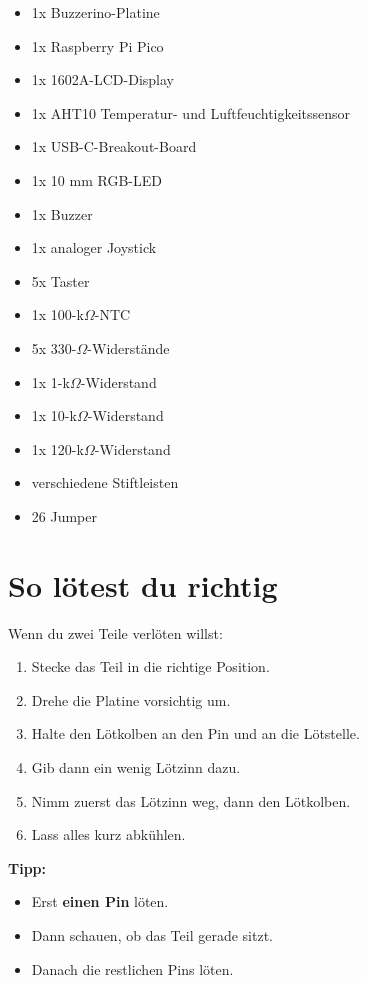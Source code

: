 \documentclass[a4paper,11pt]{article}
\begin{document}
\begin{itemize}
    \item 1x Buzzerino-Platine
    \item 1x Raspberry Pi Pico
    \item 1x 1602A-LCD-Display
    \item 1x AHT10 Temperatur- und Luftfeuchtigkeitssensor
    \item 1x USB-C-Breakout-Board
    \item 1x 10 mm RGB-LED
    \item 1x Buzzer
    \item 1x analoger Joystick
    \item 5x Taster
    \item 1x 100-k$\Omega$-NTC
    \item 5x 330-$\Omega$-Widerstände
    \item 1x 1-k$\Omega$-Widerstand
    \item 1x 10-k$\Omega$-Widerstand
    \item 1x 120-k$\Omega$-Widerstand
    \item verschiedene Stiftleisten
    \item 26 Jumper
\end{itemize}

\section*{So lötest du richtig}

Wenn du zwei Teile verlöten willst:

\begin{enumerate}
    \item Stecke das Teil in die richtige Position.
    \item Drehe die Platine vorsichtig um.
    \item Halte den Lötkolben an den Pin und an die Lötstelle.
    \item Gib dann ein wenig Lötzinn dazu.
    \item Nimm zuerst das Lötzinn weg, dann den Lötkolben.
    \item Lass alles kurz abkühlen.
\end{enumerate}

\textbf{Tipp:}
\begin{itemize}
    \item Erst \textbf{einen Pin} löten.
    \item Dann schauen, ob das Teil gerade sitzt.
    \item Danach die restlichen Pins löten.
\end{itemize}
\end{document}
